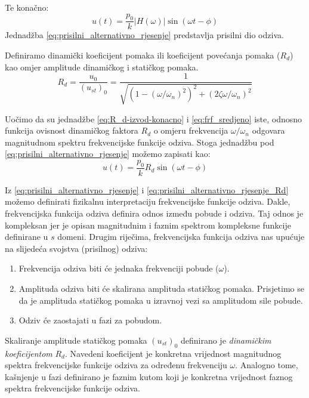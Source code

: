 Te konačno:
\begin{equation}\label{eq:prisilni_alternativno_rjesenje}
    u(t)=\frac{p_0}{k}|H(\omega)|\sin(\omega t - \phi)
\end{equation}
Jednadžba \eqref{eq:prisilni_alternativno_rjesenje} predstavlja prisilni dio odziva.

Definiramo dinamički koeficijent pomaka ili koeficijent povećanja pomaka ($R_d$) kao omjer
amplitude dinamičkog i statičkog pomaka.
\begin{equation}\label{eq:R_d-izvod-konacno}
    R_d = \frac{u_0}{(u_{st})_0}=\frac{1}{\sqrt{(1-(\omega/\omega_n)^2)^2+(2\zeta\omega/\omega_n)^2}}
\end{equation}

Uočimo da su jednadžbe \eqref{eq:R_d-izvod-konacno} i \eqref{eq:frf_sredjeno} iste,
odnosno funkcija ovisnost dinamičkog faktora $R_d$ o omjeru frekvencija
$\omega/\omega_n$ odgovara magnitudnom spektru frekvencijske funkcije odziva. Stoga
jednadžbu pod \eqref{eq:prisilni_alternativno_rjesenje} možemo zapisati kao:
\begin{equation}\label{eq:prisilni_alternativno_rjesenje_Rd}
    u(t)=\frac{p_0}{k}R_d\sin(\omega t - \phi)
\end{equation}

Iz \eqref{eq:prisilni_alternativno_rjesenje} i \eqref{eq:prisilni_alternativno_rjesenje_Rd}
možemo definirati fizikalnu interpretaciju frekvencijske funkcije odziva.
Dakle, frekvencijska funkcija odziva definira odnos između pobude i
odziva. Taj odnos je kompleksan jer je opisan magnitudnim i faznim spektrom
kompleksne funkcije definirane u $s$ domeni. Drugim riječima, frekvencijska funkcija
odziva nas upućuje na slijedeća svojstva (prisilnog) odziva:
\begin{enumerate}
    \item Frekvencija odziva biti će jednaka frekvenciji pobude ($\omega$).
    \item Amplituda odziva biti će skalirana amplituda statičkog pomaka. Prisjetimo
        se da je amplituda statičkog pomaka u izravnoj vezi sa amplitudom sile pobude.
    \item Odziv će zaostajati u fazi za pobudom. 
\end{enumerate}

Skaliranje amplitude statičkog pomaka $(u_{st})_0$ definirano je \textit{dinamičkim
koeficijentom} $R_d$. Navedeni koeficijent je konkretna vrijednost magnitudnog
spektra frekvencijske funkcije odziva za određenu frekvenciju $\omega$. Analogno
tome, kašnjenje u fazi definirano je faznim kutom koji je konkretna vrijednost
faznog spektra frekvencijske funkcije odziva.


